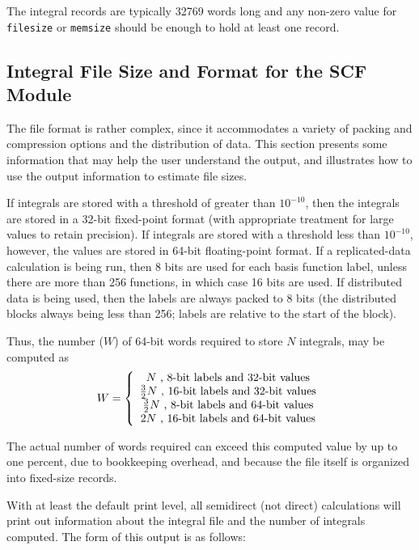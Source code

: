 The integral records are typically 32769 words long and any non-zero
value for \verb+filesize+ or \verb+memsize+ should be enough to hold
at least one record.


\subsection{Integral File Size and Format for the SCF Module}

The file format is rather complex, since it accommodates a variety of
packing and compression options and the distribution of data.  This
section presents some information that may help the user understand
the output, and illustrates how to use the output information to
estimate file sizes.

If integrals are stored with a threshold of greater than $10^{-10}$,
then the integrals are stored in a 32-bit fixed-point format (with
appropriate treatment for large values to retain precision).  If
integrals are stored with a threshold less than $10^{-10}$, however,
the values are stored in 64-bit floating-point format.  If a
replicated-data calculation is being run, then 8 bits are used for
each basis function label, unless there are more than 256 functions,
in which case 16 bits are used.  If distributed data is being used,
then the labels are always packed to 8 bits (the distributed blocks
always being less than 256; labels are relative to the start of the
block).

Thus, the number ($W$) of 64-bit words required to store $N$
integrals, may be computed as
\begin{displaymath}
  W = \left\{ \\
      \begin{array}{c}
        N \mbox{ , 8-bit labels and 32-bit values} \\
        \frac{3}{2}N \mbox{ , 16-bit labels and 32-bit values} \\
        \frac{3}{2}N \mbox{ , 8-bit labels and 64-bit values} \\
        2N \mbox{ , 16-bit labels and 64-bit values} 
      \end{array}
      \right.
\end{displaymath}

The actual number of words required can 
exceed this computed value by up to one percent, due to 
bookkeeping overhead, and because the file itself is
organized into fixed-size records.

With at least the default print level, all semidirect (not direct)
calculations will print out information about the integral file and
the number of integrals computed.  The form of this output is as
follows:

